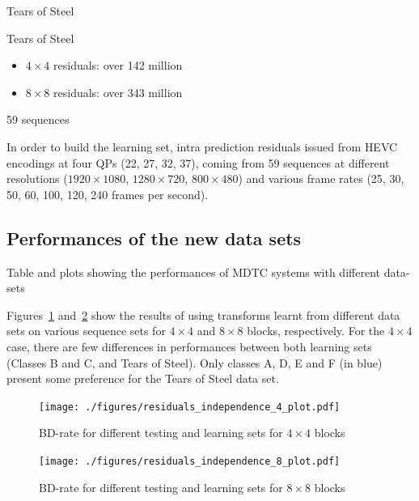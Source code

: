 \documentclass[11pt,a4paper,openright,twoside]{book}
\numberwithin{equation}{section} %
\numberwithin{figure}{section} %
\numberwithin{table}{section} %
\begin{document}
Tears of Steel

Tears of Steel
\begin{itemize}
	\item $4\times4$ residuals: over 142 million
	\item $8\times8$ residuals: over 343 million
\end{itemize}

59 sequences

In order to build the learning set, intra prediction residuals issued from
\ac{HEVC} encodings at four \acp{QP} (22, 27, 32, 37), coming from 59
sequences at different resolutions ($1920\times1080$, $1280\times720$,
$800\times480$) and various frame rates (25, 30, 50, 60, 100, 120, 240
frames per second).

\subsection{Performances of the new data sets}
\label{sub:rw_performances_new_data_set}

Table and plots showing the performances of MDTC systems with different data-sets

Figures~\ref{fig:residuals_independence_4}
and~\ref{fig:residuals_independence_8} show the results of using transforms
learnt from different data sets on various sequence sets for $4\times4$ and
$8\times8$ blocks, respectively.
For the $4\times4$ case, there are few differences in performances between
both learning sets (Classes B and C, and Tears of Steel).
Only classes A, D, E and F (in blue) present some preference for the Tears of
Steel data set.

\begin{figure}[tb]
	\centering
	\texttt{[image: ./figures/residuals\_independence\_4\_plot.pdf]}
	\caption{\acs{BD}-rate for different testing and learning sets for
	$4\times4$ blocks}
	\label{fig:residuals_independence_4}
\end{figure}

\begin{figure}[tb]
	\centering
	\texttt{[image: ./figures/residuals\_independence\_8\_plot.pdf]}
	\caption{\acs{BD}-rate for different testing and learning sets for
	$8\times8$ blocks}
	\label{fig:residuals_independence_8}
\end{figure}
\end{document}
